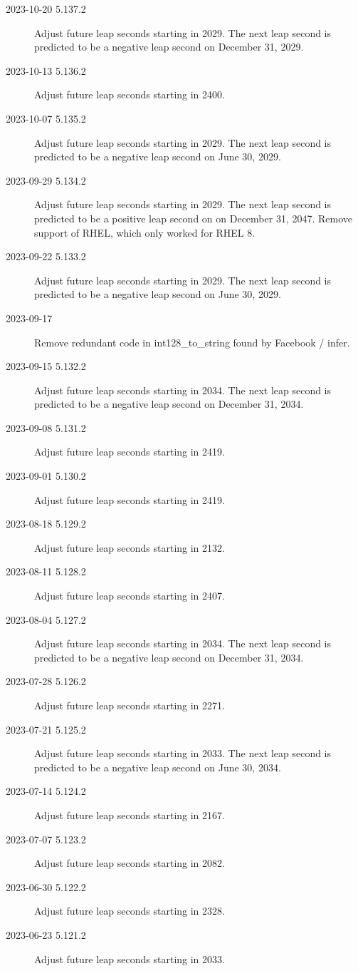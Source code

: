 \documentclass[letterpaper,twoside]{article}
\begin{document}
\begin{description}
\item[2023-10-20 5.137.2]Adjust future leap seconds starting in 2029.
  The next leap second is predicted to be a negative leap second
  on December 31, 2029.
\item[2023-10-13 5.136.2]Adjust future leap seconds starting in 2400.
\item[2023-10-07 5.135.2]Adjust future leap seconds starting in 2029.
  The next leap second is predicted to be a negative leap second
  on June 30, 2029.
\item[2023-09-29 5.134.2]Adjust future leap seconds starting in 2029.
  The next leap second is predicted to be a positive leap second
  on on December 31, 2047.
  Remove support of RHEL, which only worked for RHEL 8.
\item[2023-09-22 5.133.2]Adjust future leap seconds starting in 2029.
  The next leap second is predicted to be a negative leap second
  on June 30, 2029.
\item[2023-09-17]Remove redundant code in int128\_to\_string
  found by Facebook / infer.
\item[2023-09-15 5.132.2]Adjust future leap seconds starting in 2034.
  The next leap second is predicted to be a negative leap second
  on December 31, 2034.
\item[2023-09-08 5.131.2]Adjust future leap seconds starting in 2419.
\item[2023-09-01 5.130.2]Adjust future leap seconds starting in 2419.
\item[2023-08-18 5.129.2]Adjust future leap seconds starting in 2132.
\item[2023-08-11 5.128.2]Adjust future leap seconds starting in 2407.
\item[2023-08-04 5.127.2]Adjust future leap seconds starting in 2034.
  The next leap second is predicted to be a negative leap second
  on December 31, 2034.
\item[2023-07-28 5.126.2]Adjust future leap seconds starting in 2271.
\item[2023-07-21 5.125.2]Adjust future leap seconds starting in 2033.
  The next leap second is predicted to be a negative leap second
  on June 30, 2034.
\item[2023-07-14 5.124.2]Adjust future leap seconds starting in 2167.
\item[2023-07-07 5.123.2]Adjust future leap seconds starting in 2082.
\item[2023-06-30 5.122.2]Adjust future leap seconds starting in 2328.
\item[2023-06-23 5.121.2]Adjust future leap seconds starting in 2033.

\end{description}
\end{document}
